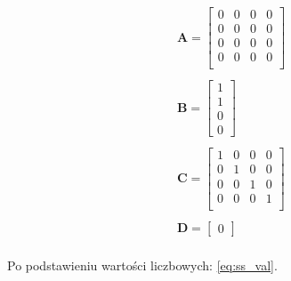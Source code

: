 \documentclass{article}
\begin{document}
\begin{equation}\label{eq:ss}
 \begin{array}{l}
  \mathbf{A} = \begin{bmatrix}  0 & 0 & 0 & 0 \\
  							   0 & 0 & 0 & 0 \\
  							   0 & 0 & 0 & 0 \\
  							   0 & 0 & 0 & 0 \\ 
  			   \end{bmatrix} \\ \\
  			   
  \mathbf{B} = \begin{bmatrix} 1 \\ 1 \\ 0 \\ 0 \end{bmatrix} \\ \\
  
  \mathbf{C} = \begin{bmatrix}  1 & 0 & 0 & 0 \\
  							   0 & 1 & 0 & 0 \\
  							   0 & 0 & 1 & 0 \\
  							   0 & 0 & 0 & 1 \\ 
  			   \end{bmatrix} \\ \\
  
  \mathbf{D} = \begin{bmatrix} 0 \end{bmatrix} \\
\end{array}
\end{equation}


Po podstawieniu wartości liczbowych: \ref{eq:ss_val}.
\end{document}
